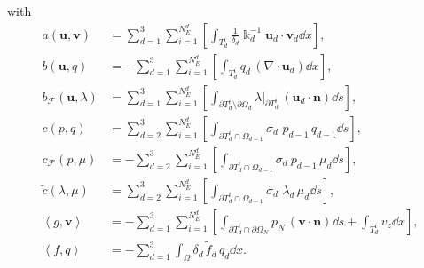 with
\begin{align}
a\left(  \mathbf{u},\mathbf{v}\right)   &  =\sum_{d=1}^{3}\sum_{i=1}%
^{N_{E}^{d}}\left[  \int_{T_{d}^{i}}\frac{1}{\delta_{d}}\Bbbk_{d}%
^{-1}\mathbf{u}_{d}\cdot\mathbf{v}_{d}\dd x\right]  ,\label{eq:weak_term_a}\\
b\left(  \mathbf{u},q\right)   &  =-\sum_{d=1}^{3}\sum_{i=1}^{N_{E}^{d}%
}\left[  \int_{T_{d}^{i}}q_{d}\,\left(  \nabla\cdot\mathbf{u}_{d}\right)
\dd x\right]  ,\\
b_{\mathcal{F}}\left(  \mathbf{u},\lambda\right)   &  =\sum_{d=1}^{3}%
\sum_{i=1}^{N_{E}^{d}}\left[  \int_{\partial T_{d}^{i}\setminus\partial
\Omega_{d}}\lambda|_{\partial T_{d}^{i}}\,\left(  \mathbf{u}_{d}%
\cdot\mathbf{n}\right)  \dd s\right]  ,\\
c\left(  p,q\right)   &  =\sum_{d=2}^{3}\sum_{i=1}^{N_{E}^{d}%
}\left[  \int_{\partial T_{d}^{i}\cap\Omega_{d-1}}\sigma_{d}\,\,p_{d-1}%
\,q_{d-1}\dd s\right]  ,\label{eq:weak_term_cbar}\\
c_{\mathcal{F}}\left(  p,\mu\right)   &  =-\sum_{d=2}^{3}\sum_{i=1}^{N_{E}%
^{d}}\left[  \int_{\partial T_{d}^{i}\cap\Omega_{d-1}}\sigma_{d}\ p_{d-1}%
\,\mu_{d}\dd s\right]  ,\label{eq:weak_term_cF}\\
\widetilde{c}\left(  \lambda,\mu\right)   &  =\sum_{d=2}^{3}\sum_{i=1}%
^{N_{E}^{d}}\left[  \int_{\partial T_{d}^{i}\cap\Omega_{d-1}}\sigma
_{d}\,\,\lambda_{d}\,\mu_{d}\dd s\right]  ,\label{eq:weak_term_ctilde}\\
\left\langle g,\mathbf{v}\right\rangle  &  =-\sum_{d=1}^{3}\sum_{i=1}%
^{N_{E}^{d}}\left[\int_{\partial T_{d}^{i}\cap\partial\Omega_{N}}p_{N}\,\left(
\mathbf{v}\cdot\mathbf{n}\right)  \dd s + \int_{T^i_d} v_z \dd x\right],\\
\left\langle f,q\right\rangle  &  =-\sum_{d=1}^{3}\int_{\Omega
}\delta_{d}\,\tilde{f}_{d}\,q_{d}\dd x. \label{eq:weak_term_f}%
\end{align}


